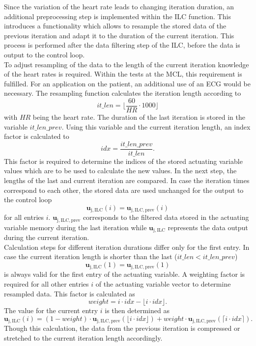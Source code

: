 Since the variation of the heart rate leads to changing iteration duration, an additional preprocessing step is implemented within the ILC function. This introduces a functionality which allows to resample the stored data of the previous iteration and adapt it to the duration of the current iteration. This process is performed after the data filtering step of the ILC, before the data is output to the control loop.
\\To adjust resampling of the data to the length of the current iteration knowledge of the heart rates is required. Within the tests at the MCL, this requirement is fulfilled. For an application on the patient, an additional use of an ECG would be necessary.
The resampling function calculates the iteration length according to
\begin{equation}
  it\_len = \lfloor\frac{60}{HR}\cdot1000\rfloor
\end{equation}
with $HR$ being the heart rate. The duration of the last iteration is stored in the variable $it\_len\_prev$. Using this variable and the current iteration length, an index factor is calculated to
\begin{equation}
  idx = \frac{it\_len\_prev}{it\_len}.
\end{equation}
This factor is required to determine the indices of the stored actuating variable values which are to be used to calculate the new values.
In the next step, the lengths of the last and current iteration are compared. In case the iteration times correspond to each other, the stored data are used unchanged for the output to the control loop
\begin{equation}
  \mathbf{u}_{\mathrm{j,ILC}}(i) = \mathbf{u}_{\mathrm{j,ILC,prev}}(i)
\end{equation} for all entries $i$. $\mathbf{u}_{\mathrm{j,ILC,prev}}$ corresponds to the filtered data stored in the actuating variable memory during the last iteration while $\mathbf{u}_{\mathrm{j,ILC}}$ represents the data output during the current iteration.
\\Calculation steps for different iteration durations differ only for the first entry. In case the current iteration length is shorter than the last ($it\_len<it\_len\_prev$)
\begin{equation}
  \mathbf{u}_{\mathrm{j,ILC}}(1) = \mathbf{u}_{\mathrm{j,ILC,prev}}(1)
\end{equation} is always valid for the first entry of the actuating variable.
A weighting factor is required for all other entries $i$ of the actuating variable vector to determine resampled data. This factor is calculated as
\begin{equation}
  weight= i \cdot idx - \lfloor i \cdot idx\rfloor.
\end{equation}
The value for the current entry $i$ is then determined as
\begin{equation}
  \mathbf{u}_{\mathrm{j,ILC}}(i) = (1-weight) \cdot \mathbf{u}_{\mathrm{j,ILC,prev}}(\lfloor i \cdot idx\rfloor) + weight\cdot \mathbf{u}_{\mathrm{j,ILC,prev}}(\lceil i \cdot idx\rceil).
\end{equation}
Though this calculation, the data from the previous iteration is compressed or stretched to the current iteration length accordingly.

